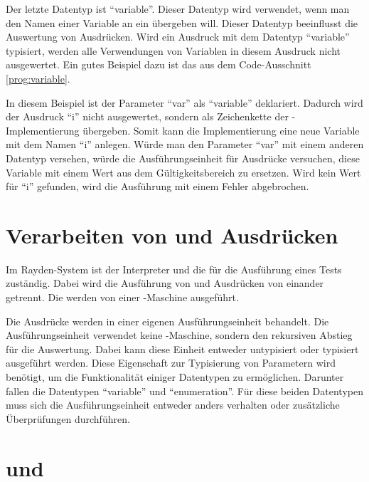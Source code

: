 \SuperPar
Der letzte Datentyp ist "`variable"'. Dieser Datentyp wird verwendet, wenn man den Namen einer Variable an ein  übergeben will. Dieser Datentyp beeinflusst die Auswertung von Ausdrücken. Wird ein Ausdruck mit dem Datentyp "`variable"' typisiert, werden alle Verwendungen von Variablen in diesem Ausdruck nicht ausgewertet. Ein gutes Beispiel dazu ist das  aus dem Code-Ausschnitt \ref{prog:variable}.

\SuperPar
In diesem Beispiel ist der Parameter "`var"' als "`variable"' deklariert. Dadurch wird der Ausdruck "`i"' nicht ausgewertet, sondern als Zeichenkette der -Implementierung übergeben. Somit kann die Implementierung eine neue Variable mit dem Namen "`i"' anlegen. Würde man den Parameter "`var"' mit einem anderen Datentyp versehen, würde die Ausführungseinheit für Ausdrücke versuchen, diese Variable mit einem Wert aus dem Gültigkeitsbereich zu ersetzen. Wird kein Wert für "`i"' gefunden, wird die Ausführung mit einem Fehler abgebrochen.

\section{Verarbeiten von  und Ausdrücken}

Im Rayden-System ist der Interpreter und die  für die Ausführung eines Tests zuständig. Dabei wird die Ausführung von  und Ausdrücken von einander getrennt. Die  werden von einer -Maschine ausgeführt. 

\SuperPar
Die Ausdrücke werden in einer eigenen Ausführungseinheit behandelt. Die Ausführungseinheit verwendet keine -Maschine, sondern den rekursiven Abstieg für die Auswertung. Dabei kann diese Einheit entweder untypisiert oder typisiert ausgeführt werden. Diese Eigenschaft zur Typisierung von Parametern wird benötigt, um die Funktionalität einiger Datentypen zu ermöglichen. Darunter fallen die Datentypen "`variable"' und "`enumeration"'. Für diese beiden Datentypen muss sich die Ausführungseinheit entweder anders verhalten oder zusätzliche Überprüfungen durchführen. 

\section{ und }



